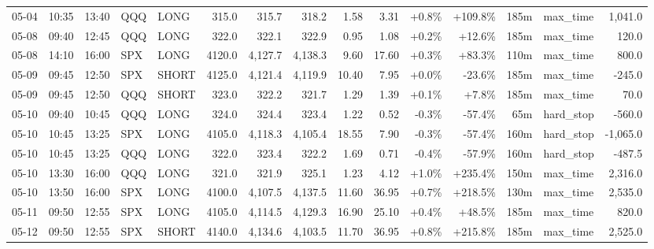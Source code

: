 \documentclass[11pt,a4paper,twoside]{article}
\begin{document}
\begin{landscape}
\begin{center}
\begin{longtable}{>{\color{txtmain}}l l l l l r r r r r r r r >{\color{txtmain}}l r}
05-04 & 10:35 & 13:40 & QQQ & LONG & 315.0 & 315.7 & 318.2 & 1.58 & 3.31 & \textcolor{wingreen}{+0.8\%} & \textcolor{wingreen}{+109.8\%} & 185m & max\_time & \textcolor{wingreen}{1,041.0} \\
05-08 & 09:40 & 12:45 & QQQ & LONG & 322.0 & 322.1 & 322.9 & 0.95 & 1.08 & \textcolor{wingreen}{+0.2\%} & \textcolor{wingreen}{+12.6\%} & 185m & max\_time & \textcolor{wingreen}{120.0} \\
05-08 & 14:10 & 16:00 & SPX & LONG & 4120.0 & 4,127.7 & 4,138.3 & 9.60 & 17.60 & \textcolor{wingreen}{+0.3\%} & \textcolor{wingreen}{+83.3\%} & 110m & max\_time & \textcolor{wingreen}{800.0} \\
05-09 & 09:45 & 12:50 & SPX & SHORT & 4125.0 & 4,121.4 & 4,119.9 & 10.40 & 7.95 & \textcolor{wingreen}{+0.0\%} & \textcolor{lossred}{-23.6\%} & 185m & max\_time & \textcolor{lossred}{-245.0} \\
05-09 & 09:45 & 12:50 & QQQ & SHORT & 323.0 & 322.2 & 321.7 & 1.29 & 1.39 & \textcolor{wingreen}{+0.1\%} & \textcolor{wingreen}{+7.8\%} & 185m & max\_time & \textcolor{wingreen}{70.0} \\
05-10 & 09:40 & 10:45 & QQQ & LONG & 324.0 & 324.4 & 323.4 & 1.22 & 0.52 & \textcolor{lossred}{-0.3\%} & \textcolor{lossred}{-57.4\%} & 65m & hard\_stop & \textcolor{lossred}{-560.0} \\
05-10 & 10:45 & 13:25 & SPX & LONG & 4105.0 & 4,118.3 & 4,105.4 & 18.55 & 7.90 & \textcolor{lossred}{-0.3\%} & \textcolor{lossred}{-57.4\%} & 160m & hard\_stop & \textcolor{lossred}{-1,065.0} \\
05-10 & 10:45 & 13:25 & QQQ & LONG & 322.0 & 323.4 & 322.2 & 1.69 & 0.71 & \textcolor{lossred}{-0.4\%} & \textcolor{lossred}{-57.9\%} & 160m & hard\_stop & \textcolor{lossred}{-487.5} \\
05-10 & 13:30 & 16:00 & QQQ & LONG & 321.0 & 321.9 & 325.1 & 1.23 & 4.12 & \textcolor{wingreen}{+1.0\%} & \textcolor{wingreen}{+235.4\%} & 150m & max\_time & \textcolor{wingreen}{2,316.0} \\
05-10 & 13:50 & 16:00 & SPX & LONG & 4100.0 & 4,107.5 & 4,137.5 & 11.60 & 36.95 & \textcolor{wingreen}{+0.7\%} & \textcolor{wingreen}{+218.5\%} & 130m & max\_time & \textcolor{wingreen}{2,535.0} \\
05-11 & 09:50 & 12:55 & SPX & LONG & 4105.0 & 4,114.5 & 4,129.3 & 16.90 & 25.10 & \textcolor{wingreen}{+0.4\%} & \textcolor{wingreen}{+48.5\%} & 185m & max\_time & \textcolor{wingreen}{820.0} \\
05-12 & 09:50 & 12:55 & SPX & SHORT & 4140.0 & 4,134.6 & 4,103.5 & 11.70 & 36.95 & \textcolor{wingreen}{+0.8\%} & \textcolor{wingreen}{+215.8\%} & 185m & max\_time & \textcolor{wingreen}{2,525.0} \\

\end{longtable}
\end{center}
\end{landscape}
\end{document}
